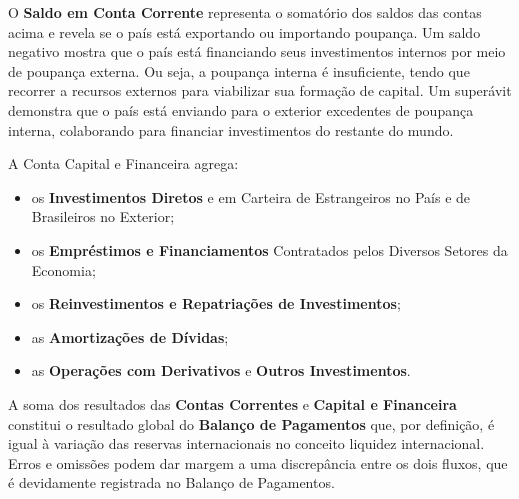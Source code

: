 \documentclass{article}\usepackage[]{graphicx}\usepackage[]{xcolor}
\begin{document}
O \textbf{Saldo em Conta Corrente} representa o somatório dos saldos das contas acima e revela se o país está exportando 
ou importando poupança. Um saldo negativo mostra que o país está financiando seus investimentos internos por meio de 
poupança externa. Ou seja, a poupança interna é insuficiente, tendo que recorrer a recursos externos para viabilizar 
sua formação de capital. Um superávit demonstra que o país está enviando para o exterior excedentes de poupança 
interna, colaborando para financiar investimentos do restante do mundo.\par

A Conta Capital e Financeira agrega:

\begin{itemize}

  \item os \textbf{Investimentos Diretos} e em Carteira de Estrangeiros no País e de Brasileiros no Exterior;
  
  \item os \textbf{Empréstimos e Financiamentos} Contratados pelos Diversos Setores da Economia;
  
  \item os \textbf{Reinvestimentos e Repatriações de Investimentos};
  
  \item as \textbf{Amortizações de Dívidas};
  
  \item as \textbf{Operações com Derivativos} e \textbf{Outros Investimentos}.
  
\end{itemize}

A soma dos resultados das \textbf{Contas Correntes} e \textbf{Capital e Financeira} constitui o resultado global 
do \textbf{Balanço de Pagamentos} que, por definição, é igual à variação das reservas internacionais no conceito liquidez 
internacional. Erros e omissões podem dar margem a uma discrepância entre os dois fluxos, que é devidamente 
registrada no Balanço de Pagamentos.
\end{document}
